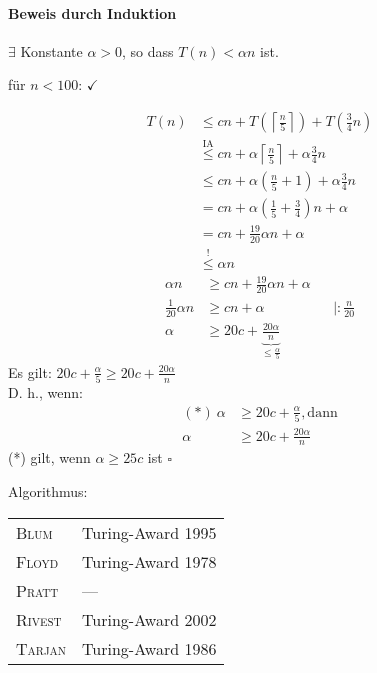 \begin{description}
		\paragraph{Beweis durch Induktion}
			\begin{description}
			 \item[Behauptung] $\exists$ Konstante $\alpha > 0$, so dass $T(n) < \alpha n$ ist.
			 \item für $n < 100$: $\checkmark$
			 \item[Induktionsschritt] 
				\begin{align*}
				 T(n) &\leq cn + T\left(\left\lceil\frac{n}{5}\right\rceil\right) + T\left(\frac{3}{4} n\right) \\
					  &\overset{\text{IA}}{\leq } cn + \alpha \left\lceil\frac{n}{5}\right\rceil + \alpha \frac{3}{4} n\\
					  &\leq cn + \alpha \left(\frac{n}{5} + 1\right) + \alpha \frac{3}{4} n \\
					  &= cn + \alpha \left(\frac{1}{5} +  \frac{3}{4}\right)n + \alpha \\
					  &= cn + \frac{19}{20} \alpha n + \alpha \\
					  &\overset{!}{\leq} \alpha n
				\end{align*}
				\begin{align*}
				 \alpha n &\geq cn + \frac{19}{20} \alpha n + \alpha\\
				 \frac{1}{20} \alpha n & \geq cn + \alpha &&| : \frac{n}{20} \\
				 \alpha & \geq 20c + \underbrace{\frac{20\alpha}{n}}_{\leq \frac{\alpha}{5}}
				\end{align*}
				Es gilt: $20 c + \frac{\alpha}{5} \geq 20c + \frac{20\alpha}{n}$ \\
				D. h., wenn:
					\begin{align*}
					(*)\ \alpha &\geq 20c + \frac{\alpha}{5}, \text{dann} \\
					\alpha &\geq 20c + \frac{20\alpha}{n}
					\end{align*}
					(*) gilt, wenn $\alpha \geq 25c$ ist \hfill$\square$
			\end{description}
		Algorithmus:
		\begin{center}
		 \begin{tabular}{ll}
			\textsc{Blum} & Turing-Award 1995 \\
			\textsc{Floyd} & Turing-Award 1978 \\
			\textsc{Pratt} & --- \\
			\textsc{Rivest} & Turing-Award 2002 \\
			\textsc{Tarjan} & Turing-Award 1986 
		 \end{tabular}
		\end{center}

\end{description}
